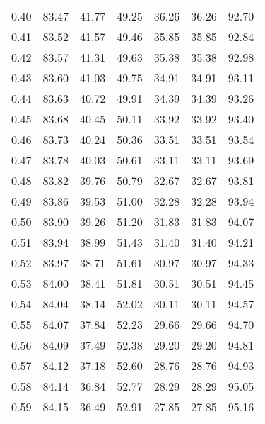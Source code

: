\begin{tabular}{|c|c|c|c|c|c|c|}
      0.40 &     83.47 &     41.77 &      49.25 &   36.26 &      36.26 &         92.70 \\
      0.41 &     83.52 &     41.57 &      49.46 &   35.85 &      35.85 &         92.84 \\
      0.42 &     83.57 &     41.31 &      49.63 &   35.38 &      35.38 &         92.98 \\
      0.43 &     83.60 &     41.03 &      49.75 &   34.91 &      34.91 &         93.11 \\
      0.44 &     83.63 &     40.72 &      49.91 &   34.39 &      34.39 &         93.26 \\
      0.45 &     83.68 &     40.45 &      50.11 &   33.92 &      33.92 &         93.40 \\
      0.46 &     83.73 &     40.24 &      50.36 &   33.51 &      33.51 &         93.54 \\
      0.47 &     83.78 &     40.03 &      50.61 &   33.11 &      33.11 &         93.69 \\
      0.48 &     83.82 &     39.76 &      50.79 &   32.67 &      32.67 &         93.81 \\
      0.49 &     83.86 &     39.53 &      51.00 &   32.28 &      32.28 &         93.94 \\
      0.50 &     83.90 &     39.26 &      51.20 &   31.83 &      31.83 &         94.07 \\
      0.51 &     83.94 &     38.99 &      51.43 &   31.40 &      31.40 &         94.21 \\
      0.52 &     83.97 &     38.71 &      51.61 &   30.97 &      30.97 &         94.33 \\
      0.53 &     84.00 &     38.41 &      51.81 &   30.51 &      30.51 &         94.45 \\
      0.54 &     84.04 &     38.14 &      52.02 &   30.11 &      30.11 &         94.57 \\
      0.55 &     84.07 &     37.84 &      52.23 &   29.66 &      29.66 &         94.70 \\
      0.56 &     84.09 &     37.49 &      52.38 &   29.20 &      29.20 &         94.81 \\
      0.57 &     84.12 &     37.18 &      52.60 &   28.76 &      28.76 &         94.93 \\
      0.58 &     84.14 &     36.84 &      52.77 &   28.29 &      28.29 &         95.05 \\
      0.59 &     84.15 &     36.49 &      52.91 &   27.85 &      27.85 &         95.16 \\

\end{tabular}
